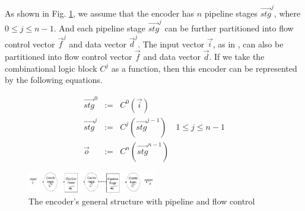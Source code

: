\documentclass[conference]{IEEEtran}
\begin{document}
As shown in Fig. \ref{fig_pipeenc},
we assume that 
the encoder has $n$ pipeline stages $\vec{stg}^j$,
where $0\le j \le n-1$.
And each pipeline stage $\vec{stg}^j$ can be further partitioned into flow control vector $\vec{f}^j$ and data vector $\vec{d}^j$.
The input vector $\vec{i}$,
as in \cite{QinTODAES15},
can also be partitioned into flow control vector $\vec{f}$ and data vector $\vec{d}$.
If we take the combinational logic block $C^j$ as a function,
then this encoder can be represented by the following equations.

\begin{equation}\label{equ_genpipe}
\begin{array}{cccc}
\vec{stg}^0   & := & C^0(\vec{i})         &\\
\vec{stg}^j   & := & C^j(\vec{stg}^{j-1}) & 1\le j\le n-1\\
\vec{o}       & := & C^n(\vec{stg}^{n-1}) &
\end{array}
\end{equation}


\begin{figure}[b]
\begin{center}
\includegraphics[width=0.5\textwidth]{pipemod}
\end{center}
\caption{The encoder's general structure with pipeline and flow control}
  \label{fig_pipeenc}
\end{figure}


% 
\end{document}

